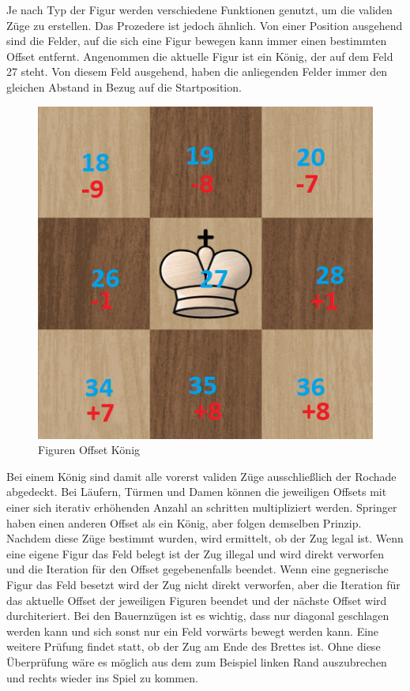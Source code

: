 Je nach Typ der Figur werden verschiedene Funktionen genutzt, um die validen Züge zu erstellen. Das Prozedere ist jedoch ähnlich.
Von einer Position ausgehend sind die Felder, auf die sich eine Figur bewegen kann immer einen bestimmten Offset entfernt.
Angenommen die aktuelle Figur ist ein König, der auf dem Feld 27 steht. Von diesem Feld ausgehend, haben die anliegenden Felder immer den gleichen Abstand in Bezug auf die Startposition.
\begin{figure}[H]
    \centering
    \includegraphics[scale=0.3]{images/offset_king.png}
    \caption{Figuren Offset König}
\end{figure}

Bei einem König sind damit alle vorerst validen Züge ausschließlich der Rochade abgedeckt. Bei Läufern, Türmen und Damen können die jeweiligen Offsets mit einer 
sich iterativ erhöhenden Anzahl an schritten multipliziert werden.
Springer haben einen anderen Offset als ein König, aber folgen demselben Prinzip. Nachdem diese Züge bestimmt wurden, wird ermittelt, ob der Zug legal ist.
Wenn eine eigene Figur das Feld belegt ist der Zug illegal und wird direkt verworfen und die Iteration für den Offset gegebenenfalls beendet. 
Wenn eine gegnerische Figur das Feld besetzt wird der Zug nicht direkt verworfen, aber die Iteration für das aktuelle Offset der jeweiligen Figuren beendet 
und der nächste Offset wird durchiteriert. 
Bei den Bauernzügen ist es wichtig, dass nur diagonal geschlagen werden kann und sich sonst nur ein Feld vorwärts bewegt werden kann.
Eine weitere Prüfung findet statt, ob der Zug am Ende des Brettes ist. Ohne diese Überprüfung wäre es möglich aus dem zum Beispiel linken Rand auszubrechen und rechts wieder
ins Spiel zu kommen.


